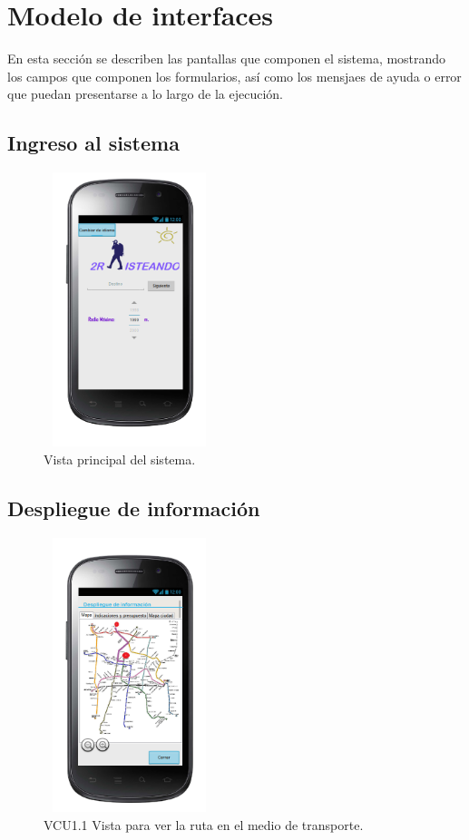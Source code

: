 \section{Modelo de interfaces}
En esta secci\'on se describen las pantallas que componen el sistema,
mostrando los campos que componen los formularios, as\'i como los mensjaes
de ayuda o error que puedan presentarse a lo largo de la ejecuci\'on.

\subsection{Ingreso al sistema}

\begin{figure}[h]
  \centering
    \includegraphics[width=5cm,height=8cm]{Imagenes/VistasSistema/VistaPrincipal.png}
  \caption{Vista principal del sistema.}  
\end{figure}

\newpage
\subsection{Despliegue de informaci\'on}
\begin{figure}[h]
  \centering
    \includegraphics[width=5cm,height=8cm]{Imagenes/VistasSistema/CU1_1.png}
  \caption{VCU1.1 Vista para ver la ruta en el medio de transporte.}  
\end{figure}

